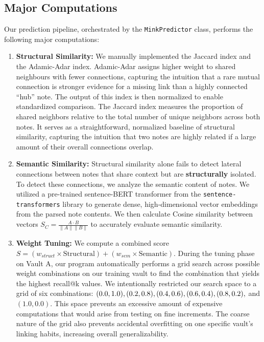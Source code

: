\documentclass[fontsize=11pt]{article}
\begin{document}
\subsection*{Major Computations}
Our prediction pipeline, orchestrated by the \texttt{MinkPredictor} class, performs the following major computations:
\begin{enumerate}
    \item \textbf{Structural Similarity:} We manually implemented the Jaccard index and the Adamic-Adar index. Adamic-Adar assigns higher weight to shared neighbours with fewer connections, capturing the intuition that a rare mutual connection is stronger evidence for a missing link than a highly connected \enquote{hub} note. The output of this index is then normalized to enable standardized comparison. The Jaccard index measures the proportion of shared neighbors relative to the total number of unique neighbors across both notes. It serves as a straightforward, normalized baseline of structural similarity, capturing the intuition that two notes are highly related if a large amount of their overall connections overlap.
    \item \textbf{Semantic Similarity:} Structural similarity alone fails to detect lateral connections between notes that share context but are \textbf{structurally} isolated. To detect these connections, we analyze the semantic content of notes. We utilized a pre-trained sentence-BERT transformer from the \texttt{sentence-transformers} library to generate dense, high-dimensional vector embeddings from the parsed note contents. We then calculate Cosine similarity between vectors $S_C = \frac{A \cdot B}{\|A\| \|B\|}$ to accurately evaluate semantic similarity.
    \item \textbf{Weight Tuning:} We compute a combined score $S = (w_{struct} \times \text{Structural}) + (w_{sem} \times \text{Semantic})$. During the tuning phase on Vault A, our program automatically performs a grid search across possible weight combinations on our training vault to find the combination that yields the highest recall@k values. We intentionally restricted our search space to a grid of six combinations: $(0.0, 1.0), (0.2, 0.8), (0.4, 0.6), (0.6, 0.4),\\ (0.8, 0.2),$ and $(1.0, 0.0)$. This space prevents an excessive amount of expensive computations that would arise from testing on fine increments. The coarse nature of the grid also prevents accidental overfitting on one specific vault's linking habits, increasing overall generalizability. 

\end{enumerate}
\end{document}
